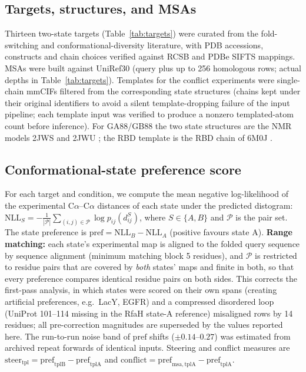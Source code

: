 \documentclass[11pt]{article}
\newcommand{\pref}{\mathrm{pref}}
\begin{document}
\subsection{Targets, structures, and MSAs}
Thirteen two-state targets (Table~\ref{tab:targets}) were curated from the
fold-switching and conformational-diversity literature, with PDB accessions,
constructs and chain choices verified against RCSB and PDBe SIFTS mappings.
MSAs were built against UniRef30 (query plus up to 256 homologous rows;
actual depths in Table~\ref{tab:targets}). Templates for the conflict
experiments were single-chain mmCIFs filtered from the corresponding state
structures (chains kept under their original identifiers to avoid a silent
template-dropping failure of the input pipeline; each template input was
verified to produce a nonzero templated-atom count before inference). For
GA88/GB88 the two state structures are the NMR models 2JWS and 2JWU
\cite{alexander2007}; the RBD template is the RBD chain of 6M0J
\cite{lan2020}.

\subsection{Conformational-state preference score}
For each target and condition, we compute the mean negative log-likelihood
of the experimental C$\alpha$--C$\alpha$ distances of each state under the
predicted distogram:
$\mathrm{NLL}_S = -\frac{1}{|\mathcal{P}|}\sum_{(i,j)\in\mathcal{P}}
\log p_{ij}(d^{S}_{ij})$,
where $S \in \{A,B\}$ and $\mathcal{P}$ is the pair set. The state
preference is $\pref = \mathrm{NLL}_B - \mathrm{NLL}_A$ (positive favours
state A). \textbf{Range matching:} each state's experimental map is aligned
to the folded query sequence by sequence alignment (minimum matching block
5 residues), and $\mathcal{P}$ is restricted to residue pairs that are
covered by \emph{both} states' maps and finite in both, so that every
preference compares identical residue pairs on both sides. This corrects
the first-pass analysis, in which states were scored on their own spans
(creating artificial preferences, e.g.\ LacY, EGFR) and a compressed
disordered loop (UniProt 101--114 missing in the RfaH state-A reference)
misaligned rows by 14 residues; all pre-correction magnitudes are superseded
by the values reported here. The run-to-run noise band of $\pref$ shifts
($\pm 0.14$--$0.27$) was estimated from archived repeat forwards of
identical inputs. Steering and conflict measures are
$\mathrm{steer}_{\mathrm{tpl}} = \pref_{\mathrm{tplB}} -
\pref_{\mathrm{tplA}}$ and $\mathrm{conflict} = \pref_{\mathrm{msa,tplA}} -
\pref_{\mathrm{tplA}}$.
\end{document}
